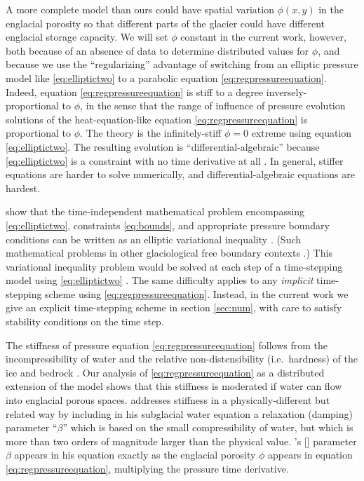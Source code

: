 \documentclass[11pt,final]{amsart}
\newcommand{\citeapos}[1]{\citeauthor{#1}'s [\citeyear{#1}]}
\begin{document}
A more complete model than ours could have spatial variation $\phi(x,y)$ in the englacial porosity so that different parts of the glacier could have different englacial storage capacity.  We will set $\phi$ constant in the current work, however, both because of an absence of data to determine distributed values for $\phi$, and because we use the ``regularizing'' advantage of switching from an elliptic pressure model like \eqref{eq:elliptictwo} to a parabolic equation \eqref{eq:regpressureequation}.  Indeed, equation \eqref{eq:regpressureequation} is stiff to a degree inversely-proportional to $\phi$, in the sense that the range of influence of pressure evolution solutions of the heat-equation-like equation \eqref{eq:regpressureequation} is proportional to $\phi$.  The \cite{Schoofetal2012} theory is the infinitely-stiff $\phi=0$ extreme using equation \eqref{eq:elliptictwo}.  The resulting evolution is ``differential-algebraic'' because \eqref{eq:elliptictwo} is a constraint with no time derivative at all \citep{AscherPetzold}.  In general, stiffer equations are harder to solve numerically, and differential-algebraic equations are hardest.

\cite{Schoofetal2012} show that the time-independent mathematical problem encompassing \eqref{eq:elliptictwo}, constraints \eqref{eq:bounds}, and appropriate pressure boundary conditions can be written as an elliptic variational inequality \citep{KinderlehrerStampacchia}.  (Such mathematical problems in other glaciological free boundary contexts \citep{SchoofStream,JouvetBueler2012}.)  This variational inequality problem would be solved at each step of a time-stepping model using \eqref{eq:elliptictwo} \citep{Hewitt2013}.  The same difficulty applies to any \emph{implicit} time-stepping scheme using \eqref{eq:regpressureequation}.  Instead, in the current work we give an explicit time-stepping scheme in section \ref{sec:num}, with care to satisfy stability conditions on the time step.

The stiffness of pressure equation \eqref{eq:regpressureequation} follows from the incompressibility of water and the relative non-distensibility (i.e.~hardness) of the ice and bedrock \citep{Clarke2003}.  Our analysis of \eqref{eq:regpressureequation} as a distributed extension of the \cite{Bartholomausetal2011} model shows that this stiffness is moderated if water can flow into englacial porous spaces.  \cite{Clarke2003} addresses stiffness in a physically-different but related way by including in his subglacial water equation a relaxation (damping) parameter  ``$\beta$'' which is based on the small compressibility of water, but which is more than two orders of magnitude larger than the physical value.  \citeapos{Clarke2003} parameter $\beta$ appears in his equation exactly as the englacial porosity $\phi$ appears in equation \eqref{eq:regpressureequation}, multiplying the pressure time derivative.
  
\end{document}
